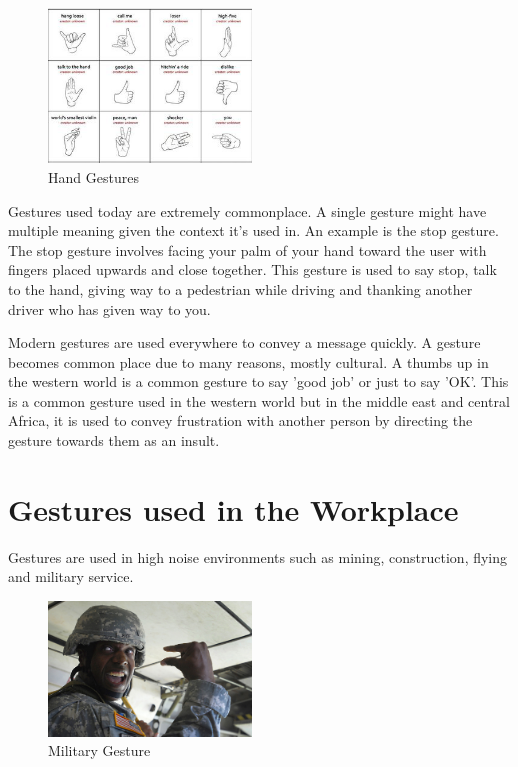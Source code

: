 \begin{figure}
  \begin{center}
    \includegraphics[width=0.48\textwidth]{img/handgesture.png}
  \end{center}
  \caption{Hand Gestures}
\end{figure}

Gestures used today are extremely commonplace. A single gesture might have multiple meaning given the context it's used in. An example is the stop gesture. The stop gesture involves facing your palm of your hand toward the user with fingers placed upwards and close together. This gesture is used to say stop, talk to the hand, giving way to a pedestrian while driving and thanking another driver who has given way to you. \cite{whygesture}

Modern gestures are used everywhere to convey a message quickly. A gesture becomes common place due to many reasons, mostly cultural. A thumbs up in the western world is a common gesture to say 'good job' or just to say 'OK'. This is a common gesture used in the western world but in the middle east and central Africa, it is used to convey frustration with another person by directing the gesture towards them as an insult. \cite{whygesture}

\section{Gestures used in the Workplace}
Gestures are used in high noise environments such as mining, construction, flying and military service. 

\begin{figure}
  \begin{center}
    \includegraphics[width=0.48\textwidth]{img/militarygesture.jpg}
  \end{center}
  \caption{Military Gesture}
\end{figure}


